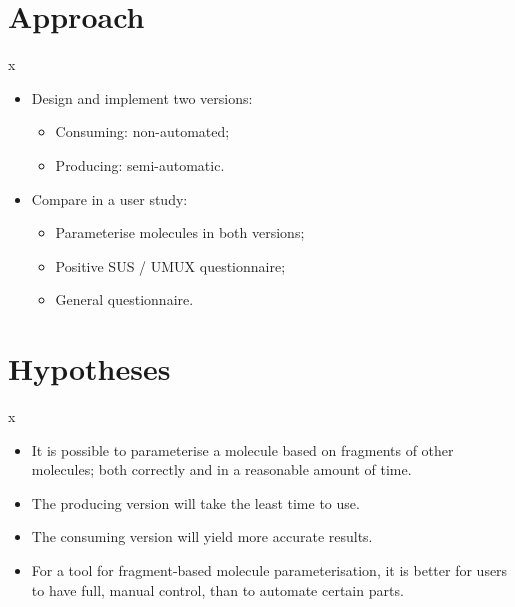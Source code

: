 \documentclass{beamer}
\newlength{\wideitemsep}
\let\olditem\item
\renewcommand{\item}[1][\wideitemsep]{\setlength{\itemsep}{#1}\olditem}
\def\sitem{\item[.2em]}
\begin{document}
\section{Approach}
\begin{frame}{x}{}
\begin{itemize}
\item<1-> Design and implement two versions:
      \begin{itemize}
      \sitem Consuming: non-automated;
      \sitem Producing: semi-automatic.
      \end{itemize}
\item<2-> Compare in a user study:
      \begin{itemize}
      \sitem Parameterise molecules in both versions;
      \sitem Positive SUS / UMUX questionnaire;
      \sitem General questionnaire.
      \end{itemize}
\end{itemize}
\end{frame}



\section{Hypotheses}
\begin{frame}{x}{}
\begin{itemize}
\item<1-> It is possible to parameterise a molecule based on fragments of other molecules; both correctly and in a reasonable amount of time.
\item<2-> The producing version will take the least time to use.
\item<3-> The consuming version will yield more accurate results.
\item<4-> For a tool for fragment-based molecule parameterisation, it is better for users to have full, manual control, than to automate certain parts.
\end{itemize}
\end{frame}
\end{document}
